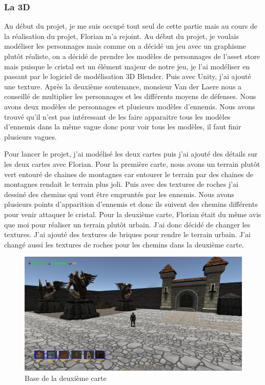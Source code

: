 \documentclass[a4paper, 12pt]{article}
\begin{document}
\subsubsection{La 3D}
Au début du projet, je me suis occupé tout seul de cette partie mais au cours de la réalisation du projet, Florian m’a rejoint. Au début du projet, je voulais modéliser les personnages mais comme on a décidé un jeu avec un graphisme plutôt réaliste, on a décidé de prendre les modèles de personnages de l’asset  store mais puisque le cristal est un élément majeur de notre jeu, je l’ai modéliser en passant par le logiciel de modélisation 3D Blender. Puis avec Unity, j’ai ajouté une texture. Après la deuxième soutenance, monsieur Van der Laere nous a conseillé de multiplier les personnages et les différents moyens de défenses. Nous avons deux modèles de personnages et plusieurs modèles d’ennemis. Nous avons trouvé qu’il n’est pas intéressant de les faire apparaitre tous les modèles d’ennemis dans la même vague donc pour voir tous les modèles, il faut finir plusieurs vagues.
\par Pour lancer le projet, j’ai modélis\'e les deux cartes puis j’ai ajouté des détails sur les deux cartes avec Florian. Pour la première carte, nous avons un terrain plutôt vert entouré de chaines de montagnes car entourer le terrain par des chaines de montagnes rendait le terrain plus joli. Puis avec des textures de roches j’ai dessiné des chemins qui vont être empruntés par les ennemis. Nous avons plusieurs points d’apparition d’ennemis et donc ils suivent des chemins différents pour venir attaquer le cristal. Pour la deuxième carte, Florian était du même avis que moi pour r\'ealiser un terrain plutôt urbain. J’ai donc décidé de changer les textures. J’ai ajouté des textures de briques pour rendre le terrain urbain. J’ai chang\'e aussi les textures de roches pour les chemins dans la deuxième carte.
\begin{figure}[!ht]
\centerline{\includegraphics[scale=0.3]{3Dmap2.png}}
\caption*{Base de la deuxi\`eme carte}
\end{figure}
\end{document}
